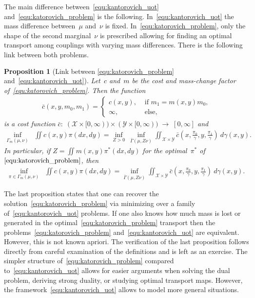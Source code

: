 \documentclass{article}
\newtheorem{proposition}[theorem]{Proposition}
\theoremstyle{definition}
\begin{document}
The main difference between~\eqref{equ:kantorovich_uot} and~\eqref{equ:katorovich_problem} is the following. In~\eqref{equ:kantorovich_uot} the mass difference between~$\mu$ and~$\nu$ is fixed. In~\eqref{equ:katorovich_problem}, only the shape of the second marginal~$\nu$ is prescribed allowing for finding an optimal transport among couplings with varying mass differences. There is the following link between both problems.
\begin{proposition}[Link between \eqref{equ:katorovich_problem} and~\eqref{equ:kantorovich_uot}]\label{the:ncot_vs_uot}
    Let~$c$ and~$m$ be the cost and mass-change factor of~\eqref{equ:katorovich_problem}. Then the function
    \begin{align}
        \bar c(x,y,m_0, m_1) = \begin{cases}
            c(x,y), & \mbox{ if } m_1= m(x,y) m_0, \\
            \infty, & \mbox{ else,}
        \end{cases}
    \end{align}
    is a cost function $\bar c \colon\; (\mathcal{X}\times[0,\infty)) \times (\mathcal{Y}\times[0,\infty))  \;\to\; [0,\infty]$ and 
    \begin{align}\label{equ:ncot_vs_uot_1}
        \inf_{\Gamma_m(\mu, \nu)} &  \iint c(x,y) \pi(dx, dy) = \inf_{Z >0} \ \inf_{\bar \Gamma(\mu, Z \nu)}  \iint_{\mathcal{X} \times \mathcal{Y}} \bar c \left( x,\frac{ \pi_0}{ \gamma},y,\frac{ \pi_1}{ \gamma}\right)  \ d \gamma(x,y).
    \end{align}
    In particular, if $Z = \iint m(x,y) \pi^*(dx, dy)$ for the optimal~$\pi^*$ of~$\eqref{equ:katorovich_problem}$, then  
    \begin{align}\label{equ:ncot_vs_uot_2}
        \inf_{\pi \in \Gamma_m(\mu, \nu)} &  \iint c(x,y) \pi(dx, dy) = \inf_{\bar \Gamma(\mu, Z \nu)}  \iint_{\mathcal{X} \times \mathcal{Y}} \bar c \left( x,\frac{ \pi_0}{ \gamma},y,\frac{ \pi_1}{ \gamma}\right)  \ d \gamma(x,y).
    \end{align}    
\end{proposition}
The last proposition states that one can recover the solution~\eqref{equ:katorovich_problem} via minimizing over a family of~\eqref{equ:kantorovich_uot} problems. If one also knows how much mass is lost or generated in the optimal~\eqref{equ:katorovich_problem} transport then the problems~\eqref{equ:katorovich_problem} and~\eqref{equ:kantorovich_uot} are equivalent. However, this is not known apriori. The verification of the last proposition follows directly from careful examination of the definitions and is left as an exercise. The simpler structure of~\eqref{equ:katorovich_problem} compared to~\eqref{equ:kantorovich_uot} allows for easier arguments when solving the dual problem, deriving strong duality, or studying optimal transport maps. However, the framework~\eqref{equ:kantorovich_uot} allows to model more general situations. 
\end{document}
